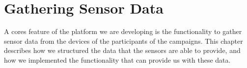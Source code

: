 \chapter{Gathering Sensor Data}
\label{cha:gathering_sensor_data}

A cores feature of the platform we are developing is the functionality to gather sensor data from the devices of the participants of the campaigns. This chapter describes how we structured the data that the sensors are able to provide, and how we implemented the functionality that can provide us with these data.






